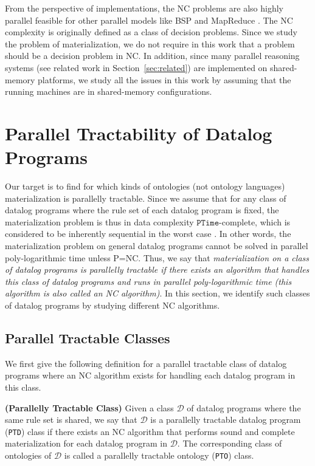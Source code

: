 \documentclass[final,1p,times]{elsarticle}
\begin{document}
From the perspective of implementations, the NC problems are also highly
parallel feasible for other parallel models like BSP \cite{Valiant90}
and MapReduce \cite{KarloffSV10}. The NC complexity is originally defined
as a class of decision problems. Since we study the problem of materialization, we do not
require in this work that a problem should be a decision problem in NC.
In addition, since many parallel reasoning systems (see related work in Section~\ref{sec:related})
are implemented on shared-memory platforms, we
study all the issues in this work by assuming that the running machines are in
shared-memory configurations.


\section{Parallel Tractability of Datalog Programs}
\label{sec:ptclass}

Our target is to find for which kinds of ontologies (not ontology languages)
materialization is parallelly tractable.
Since we assume that for any class of datalog programs where the rule
set of each datalog program is fixed, the materialization problem is thus in data complexity
$\texttt{PTime}$-complete, which is considered to be inherently sequential in the worst
case \cite{Raymond95}. In other words, the materialization problem on general
datalog programs cannot be solved in parallel poly-logarithmic time unless P=NC.
Thus, we say that \emph{materialization on a class of datalog programs is parallelly tractable
if there exists an algorithm that handles this class of datalog programs and runs in parallel
poly-logarithmic time (this algorithm is also called an NC algorithm)}.
In this section, we identify such classes of datalog programs by studying different NC algorithms.


\subsection{Parallel Tractable Classes}

We first give the following definition for a parallel tractable class of datalog programs
where an NC algorithm exists for handling each datalog program in this class.

\begin{definition}\label{def:ptd}
\textbf{(Parallelly Tractable Class)} Given a class $\mathcal{D}$ of datalog programs where the
same rule set is shared, we say that $\mathcal{D}$ is a parallelly tractable datalog program (\texttt{PTD}) class
if there exists an NC algorithm that performs sound and complete materialization for each datalog program
in $\mathcal{D}$. The corresponding class of ontologies of $\mathcal{D}$ is called a
parallelly tractable ontology (\texttt{PTO}) class.
\end{definition}
\end{document}
